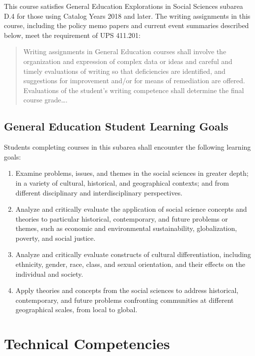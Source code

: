 \documentclass[11pt, letterpaper]{article}
\begin{document}
	This course satisfies General Education Explorations in Social Sciences subarea D.4 for those using Catalog Years 2018 and later. The writing assignments in this course, including the policy memo papers and current event summaries described below, meet the requirement of UPS 411.201: 
	\begin{quote}Writing assignments in General Education courses shall involve the organization and expression of complex data or ideas and careful and timely evaluations of writing so that deficiencies are identified, and suggestions for improvement and/or for means of remediation are offered. Evaluations of the student's writing competence shall determine the final course grade\ldots .\end{quote}

\subsection*{General Education Student Learning Goals}

	Students completing courses in this subarea shall encounter the following learning goals:

\begin{enumerate}
	\item Examine problems, issues, and themes in the social sciences in greater depth; in a variety of cultural, historical, and geographical contexts; and from different disciplinary and interdisciplinary perspectives.
	\item Analyze and critically evaluate the application of social science concepts and theories to particular historical, contemporary, and future problems or themes, such as economic and environmental sustainability, globalization, poverty, and social justice.
	\item Analyze and critically evaluate constructs of cultural differentiation, including ethnicity, gender, race, class, and sexual orientation, and their effects on the individual and society.
	\item Apply theories and concepts from the social sciences to address historical, contemporary, and future problems confronting communities at different geographical scales, from local to global.
\end{enumerate}

\section{Technical Competencies}
\end{document}
